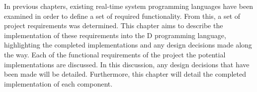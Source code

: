 








In previous chapters,
existing real-time system programming languages have been examined in order to
define a set of required functionality. From this, a set of project requirements 
was determined. 
This chapter aims to describe the implementation of these requirements into the D
programming language, highlighting the completed implementations and any design 
decisions made along the way. 
Each of the functional requirements of the project the potential
implementations are discussed. In this discussion, any design 
decisions that have been made will be detailed. Furthermore, this chapter will 
detail the completed implementation of each component. 

